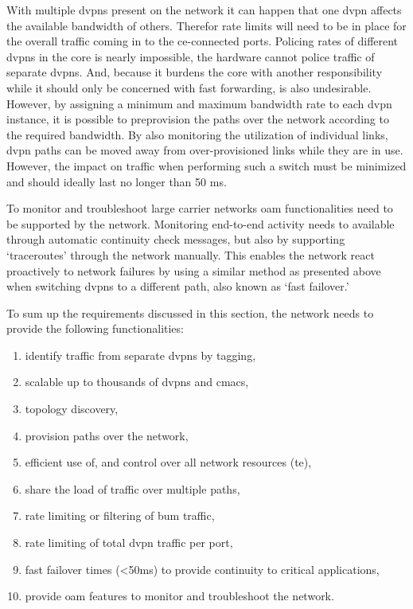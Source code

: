 With multiple \acp{dvpn} present on the network it can happen that one \ac{dvpn} affects the available bandwidth of others. Therefor rate limits will need to be in place for the overall traffic coming in to the \ac{ce}-connected ports. Policing rates of different \acp{dvpn} in the core is nearly impossible, the hardware cannot police traffic of separate \acp{dvpn}. And, because it burdens the core with another responsibility while it should only be concerned with fast forwarding, is also undesirable. However, by assigning a minimum and maximum bandwidth rate to each \ac{dvpn} instance, it is possible to preprovision the paths over the network according to the required bandwidth. By also monitoring the utilization of individual links, \ac{dvpn} paths can be moved away from over-provisioned links while they are in use. However, the impact on traffic when performing such a switch must be minimized and should ideally last no longer than 50 ms.

To monitor and troubleshoot large carrier networks \ac{oam} functionalities need to be supported by the network. Monitoring end-to-end activity needs to available through automatic continuity check messages, but also by supporting `traceroutes' through the network manually. This enables the network react proactively to network failures by using a similar method as presented above when switching \acp{dvpn} to a different path, also known as `fast failover.'

To sum up the requirements discussed in this section, the network needs to provide the following functionalities:

\begin{enumerate}
	\item identify traffic from separate \acp{dvpn} by tagging, 
	\item scalable up to thousands of \acp{dvpn} and \acsp{cmac},
	\item topology discovery, 
	\item provision paths over the network,
	\item efficient use of, and control over all network resources (\ac{te}),
	\item share the load of traffic over multiple paths,
	\item rate limiting or filtering of \ac{bum} traffic,
	\item rate limiting of total \ac{dvpn} traffic per port,
	\item fast failover times (<50ms) to provide continuity to critical applications,
	\item provide \acl{oam} features to monitor and troubleshoot the network.
\end{enumerate}

